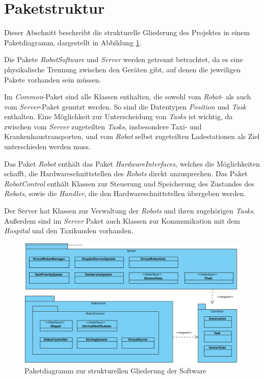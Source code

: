 \section{Paketstruktur}
Dieser Abschnitt beschreibt die strukturelle Gliederung des Projektes in einem Paketdiagramm, dargestellt in Abbildung \ref{Paketstruktur}.

Die Pakete \textit{RobotSoftware} und \textit{Server} werden getrennt betrachtet, da es eine physikalische Trennung zwischen den Geräten gibt, auf denen die jeweiligen Pakete vorhanden sein müssen.

Im \textit{Common}-Paket sind alle Klassen enthalten, die sowohl vom \textit{Robot}- als auch vom \textit{Server}-Paket genutzt werden. 
So sind die Datentypen \textit{Position} und \textit{Task} enthalten. 
Eine Möglichkeit zur Unterscheidung von \textit{Tasks} ist wichtig, da zwischen vom \textit{Server} zugeteilten \textit{Tasks}, insbesondere Taxi- und Krankenhaustransporten, und vom \textit{Robot} selbst zugeteilten Ladestationen als Ziel unterschieden werden muss. 

Das Paket \textit{Robot} enthält das Paket \textit{HardwareInterfaces}, welches die Möglichkeiten schafft, die Hardwareschnittstellen des \textit{Robots} direkt anzusprechen. 
Das Paket \textit{RobotControl} enthält Klassen zur Steuerung und Speicherung des Zustandes des \textit{Robots}, sowie die \emph{Handler}, die den Hardwareschnittstellen übergeben werden.

Der Server hat Klassen zur Verwaltung der \textit{Robots} und ihren zugehörigen \textit{Tasks}. 
Außerdem sind im \textit{Server} Paket auch Klassen zur Kommunikation mit dem \textit{Hospital} und den Taxikunden vorhanden.

\begin{figure}[H]
\centering
\includegraphics[height=0.85\textwidth, angle=90]{img/6_paketdiagramm}
\caption{Paketdiagramm zur strukturellen Gliederung der Software}
\label{Paketstruktur}
\end{figure}